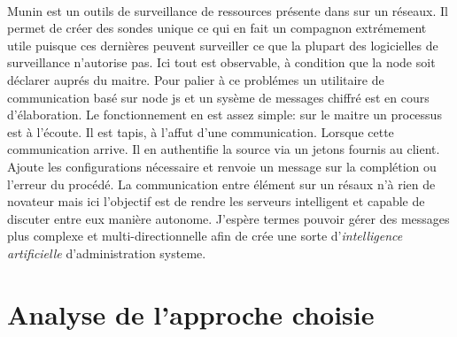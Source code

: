 \documentclass[11pt, a4paper ]{article}
\let\stdsection\section
\renewcommand\section{\newpage\stdsection}
\begin{document}
\begin{spacing}{1.5}
\paragraph{}
Munin est un outils de surveillance de ressources présente dans sur un réseaux. Il permet de créer des sondes unique ce qui en fait un compagnon extrémement utile puisque ces dernières peuvent surveiller ce que la plupart des logicielles de surveillance n'autorise pas. Ici tout est observable, à  condition que la node soit déclarer auprés du maitre. Pour palier à ce problémes un utilitaire de communication basé sur node js et un sysème de messages chiffré est en cours d'élaboration. 
Le fonctionnement en est assez simple: sur le maitre un processus est à l'écoute. Il est tapis, à l'affut d'une communication. Lorsque cette communication arrive. Il en authentifie la source via un jetons fournis au client. Ajoute les configurations nécessaire et renvoie un message sur la complétion ou l'erreur du procédé. La communication entre élément sur un résaux n'à rien de novateur mais ici l'objectif est de rendre les serveurs intelligent et capable de discuter entre eux manière autonome. J'espère termes pouvoir gérer des messages plus complexe et multi-directionnelle afin de crée une sorte d'\emph{intelligence artificielle} d'administration systeme.



	\section{Analyse de l'approche choisie} %








\end{spacing}
\end{document}
